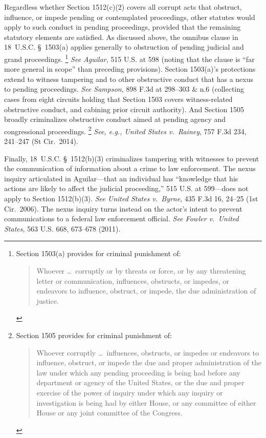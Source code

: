 Regardless whether Section 1512(c)(2) covers all corrupt acts that obstruct, influence, or impede pending or contemplated proceedings, other statutes would apply to such conduct in pending proceedings, provided that the remaining statutory elements are satisfied.
As discussed above, the omnibus clause in 18~U.S.C. \S~1503(a) applies generally to obstruction of pending judicial and grand proceedings.%
\footnote{Section 1503(a) provides for criminal punishment of:
\begin{quote}
Whoever \dots\ corruptly or by threats or force, or by any threatening letter or communication, influences, obstructs, or impedes, or endeavors to influence, obstruct, or impede, the due administration of justice.
\end{quote}}
\textit{See Aguilar}, 515 U.S. at 598 (noting that the clause is ``far more general in scope'' than preceding provisions).
Section 1503(a)'s protections extend to witness tampering and to other obstructive conduct that has a nexus to pending proceedings.
\textit{See Sampson}, 898 F.3d at 298--303 \& n.6 (collecting cases from eight circuits holding that Section 1503 covers witness-related obstructive conduct, and cabining prior circuit authority).
And Section 1505 broadly criminalizes obstructive conduct aimed at pending agency and congressional proceedings.%
\footnote{Section 1505 provides for criminal punishment of:
\begin{quote}
Whoever corruptly \dots\ influences, obstructs, or impedes or endeavors to influence, obstruct, or impede the due and proper administration of the law under which any pending proceeding is being had before any department or agency of the United States, or the due and proper exercise of the power of inquiry under which any inquiry or investigation is being had by either House, or any committee of either House or any joint committee of the Congress.
\end{quote}}
\textit{See, e.g., United States v.\ Rainey}, 757 F.3d 234, 241--247 (St Cir.~2014).

Finally, 18~U.S.C. \S~1512(b)(3) criminalizes tampering with witnesses to prevent the communication of information about a crime to law enforcement.
The nexus inquiry articulated in Aguilar---that an individual has ``knowledge that his actions are likely to affect the judicial proceeding,'' 515 U.S. at 599---does not apply to Section 1512(b)(3).
\textit{See United States v.\ Byrne}, 435 F.3d 16, 24--25 (1st Cir.~2006).
The nexus inquiry turns instead on the actor's intent to prevent communications to a federal law enforcement official.
\textit{See Fowler v.\ United States}, 563 U.S. 668, 673--678 (2011).

